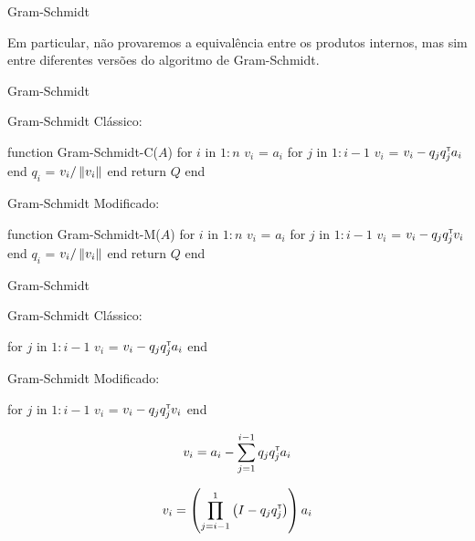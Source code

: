 
\begin{frame}{Gram-Schmidt}
  \begin{center}
    Em particular, não provaremos a equivalência entre os produtos internos, mas sim entre diferentes versões do algoritmo de Gram-Schmidt.
  \end{center}
\end{frame}

\begin{frame}[fragile]{Gram-Schmidt}
  \begin{minipage}[t]{0.45\textwidth}
    Gram-Schmidt Clássico:
    \vspace{0.2cm}
    \begin{code}
function Gram-Schmidt-C($A$)
    for $i$ in $1:n$
        $v_i$ = $a_i$
        for $j$ in $1:i-1$
            $v_i$ = $v_i - q_j q_j^{\scriptscriptstyle\mathsf{T}\mkern-1mu} a_i$
        end
        $q_i$ = $v_i / \left\lVert v_i\right\rVert$
    end
    return $Q$
end
    \end{code}
  \end{minipage}
  \pause
  \hfill
  \vrule
  \hfill
  \begin{minipage}[t]{0.50\textwidth}
    Gram-Schmidt Modificado:
    \vspace{0.2cm}
    \begin{code}
function Gram-Schmidt-M($A$)
    for $i$ in $1:n$
        $v_i$ = $a_i$
        for $j$ in $1:i-1$
            $v_i$ = $v_i - q_j q_j^{\scriptscriptstyle\mathsf{T}\mkern-1mu} v_i$
        end
        $q_i$ = $v_i / \left\lVert v_i\right\rVert$
    end
    return $Q$
end
    \end{code}
  \end{minipage}
  \vfill
\end{frame}

\begin{frame}[fragile]{Gram-Schmidt}
  \begin{minipage}[t]{0.45\textwidth}
    Gram-Schmidt Clássico:
    \vspace{0.2cm}
    \begin{code}
  for $j$ in $1:i-1$
      $v_i$ = $v_i - q_j q_j^{\scriptscriptstyle\mathsf{T}\mkern-1mu} a_i$
  end
    \end{code}
  \end{minipage}
  \pause
  \hfill
  \vrule
  \hfill
  \begin{minipage}[t]{0.50\textwidth}
    Gram-Schmidt Modificado:
    \vspace{0.2cm}
    \begin{code}
  for $j$ in $1:i-1$
      $v_i$ = $v_i - q_j q_j^{\scriptscriptstyle\mathsf{T}\mkern-1mu} v_i$
  end
    \end{code}
  \end{minipage}
  \vfill
  \pause
  \begin{minipage}[t]{0.45\textwidth}
    \[v_i = a_i - \sum_{j=1}^{i-1} q_j q_j^{\scriptscriptstyle\mathsf{T}\mkern-1mu} a_i\]
  \end{minipage}
  \pause
  \hfill
  \vrule
  \hfill
  \begin{minipage}[t]{0.50\textwidth}
    \[v_i = \left(\prod_{j=i-1}^{1} \left(I - q_j q_j^{\scriptscriptstyle\mathsf{T}\mkern-1mu}\right) \right) a_i\]
  \end{minipage}
  \vfill
\end{frame}

